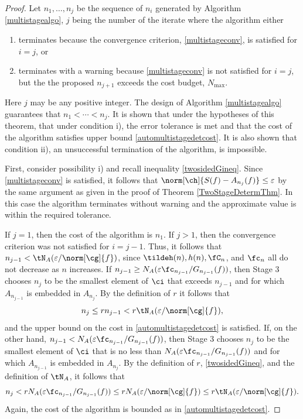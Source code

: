 \documentclass[]{elsarticle}
\theoremstyle{definition}
\theoremstyle{remark}
\begin{document}
\begin{proof} Let $n_1, \ldots, n_{j}$ be the sequence of $n_i$ generated by Algorithm \ref{multistagealgo}, $j$ being the number of the iterate where the algorithm either 
\begin{enumerate}
\renewcommand{\labelenumi}{\roman{enumi})}
\item terminates because the convergence criterion, \eqref{multistageconv}, is satisfied for $i=j$, or 

\item terminates with a warning because \eqref{multistageconv} is not satisfied for $i=j$, but the the proposed $n_{j+1}$ exceeds the cost budget, $N_{\max}$. 

\end{enumerate}
Here $j$ may be any positive integer.  The design of Algorithm \ref{multistagealgo} guarantees that $n_1 < \cdots < n_j$.  It is shown that under the hypotheses of this theorem, that under condition i), the error tolerance is met and that the cost of the algorithm satisfies upper bound \eqref{automultistagedetcost}. It is also shown that condition ii), an unsuccessful termination of the algorithm, is impossible.  

First, consider possibility i) and recall inequality \eqref{twosidedGineq}.
Since \eqref{multistageconv} is satisfied, it follows that $\norm[\ch]{S(f)-A_{n_j}(f)} \le \varepsilon$ by the same argument as given in the proof of Theorem \ref{TwoStageDetermThm}.  In this case the algorithm terminates without warning and the approximate value is within the required tolerance.

If $j=1$, then the cost of the algorithm is $n_1$.  If $j>1$, then the convergence criterion was not satisfied for $i=j-1$. Thus, it follows that $n_{j-1} < \tN_A(\varepsilon/\norm[\cg]{f})$, since $\tildeh(n), h(n), \fC_n$, and $\fc_n$ all do not decrease as $n$ increases. 
If $n_{j-1} \ge N_{A}(\varepsilon \fc_{n_{j-1}}/G_{n_{j-1}}(f))$, then Stage 3 chooses $n_{j}$ to be the smallest element of $\ci$ that exceeds $n_{j-1}$ and for which $A_{n_{j-1}}$ is embedded in $A_{n_j}$.  By the definition of $r$ it follows that
\begin{equation*}
n_{j} \le r  n_{j-1} < r \tN_{A}(\varepsilon/\norm[\cg]{f}),
\end{equation*}
and the upper bound on the cost in \eqref{automultistagedetcost} is satisfied.
If, on the other hand, $n_{j-1} < N_{A}(\varepsilon \fc_{n_{j-1}}/G_{n_{j-1}}(f))$, then Stage 3 chooses $n_{j}$ to be the smallest element of $\ci$ that is no less than $N_{A}(\varepsilon \fc_{n_{j-1}}/G_{n_{j-1}}(f))$ and for which $A_{n_{j-1}}$ is embedded in $A_{n_j}$.  By the definition of $r$, \eqref{twosidedGineq}, and the definition of $\tN_A$, it follows that
\begin{equation*}
n_{j} < r  N_{A}(\varepsilon \fc_{n_{j-1}}/G_{n_{j-1}}(f)) \le r  N_{A}(\varepsilon/\norm[\cg]{f}) \le r \tN_{A}(\varepsilon/\norm[\cg]{f}).
\end{equation*}
Again, the cost of the algorithm is bounded as in \eqref{automultistagedetcost}.


\end{proof}
\end{document}
